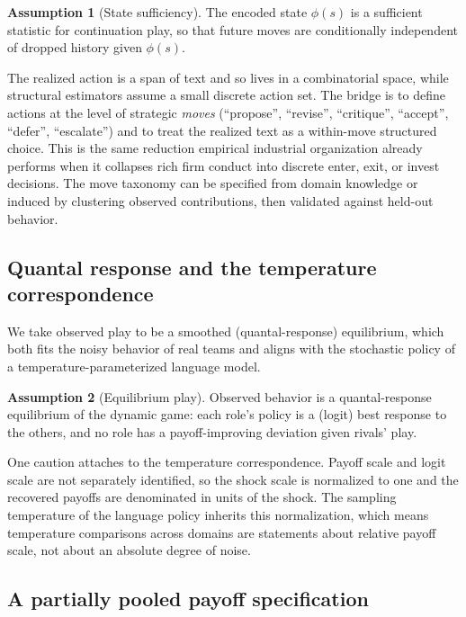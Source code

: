 \documentclass[11pt]{article}
\theoremstyle{definition}
\newtheorem{assumption}{Assumption}
\begin{document}
\begin{assumption}[State sufficiency]
\label{ass:state}
The encoded state $\phi(s)$ is a sufficient statistic for continuation play, so that future moves are conditionally independent of dropped history given $\phi(s)$.
\end{assumption}

The realized action is a span of text and so lives in a combinatorial space, while structural estimators assume a small discrete action set. The bridge is to define actions at the level of strategic \emph{moves} (``propose'', ``revise'', ``critique'', ``accept'', ``defer'', ``escalate'') and to treat the realized text as a within-move structured choice. This is the same reduction empirical industrial organization already performs when it collapses rich firm conduct into discrete enter, exit, or invest decisions. The move taxonomy can be specified from domain knowledge or induced by clustering observed contributions, then validated against held-out behavior.

\subsection{Quantal response and the temperature correspondence}

We take observed play to be a smoothed (quantal-response) equilibrium, which both fits the noisy behavior of real teams and aligns with the stochastic policy of a temperature-parameterized language model.

\begin{assumption}[Equilibrium play]
\label{ass:eq}
Observed behavior is a quantal-response equilibrium of the dynamic game: each role's policy is a (logit) best response to the others, and no role has a payoff-improving deviation given rivals' play.
\end{assumption}

One caution attaches to the temperature correspondence. Payoff scale and logit scale are not separately identified, so the shock scale is normalized to one and the recovered payoffs are denominated in units of the shock. The sampling temperature of the language policy inherits this normalization, which means temperature comparisons across domains are statements about relative payoff scale, not about an absolute degree of noise.

\subsection{A partially pooled payoff specification}
\end{document}
